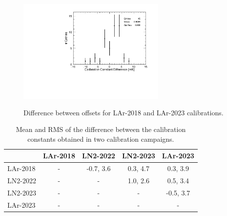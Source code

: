 \begin{figure}[htbp]
\centering
{\includegraphics[width=0.65\textwidth]{images/figure_20.pdf}}
\caption{Difference between offsets for LAr-2018 and LAr-2023 calibrations.}
\label{fig:LAr2018AllDiff}
\end{figure}

\begin{table}[htbp]
\begin{center}
\begin{tabular}{l c c c c}
         & LAr-2018 & LN2-2022 & LN2-2023 & LAr-2023  \\ \hline
LAr-2018 &    -     & -0.7, 3.6& 0.3, 4.7 & 0.3, 3.9 \\ 
LN2-2022 &    -     &    -     & 1.0, 2.6 &  0.5, 3.4 \\ 
LN2-2023 &    -     &    -     &    -     & -0.5, 3.7 \\ 
LAr-2023 &    -     &    -     &    -     &     -     \\ 
\end{tabular}
\end{center}
\caption{Mean and RMS of the difference between the calibration constants obtained in two calibration campaigns.}
\label{tab:calib_comparison}
\end{table}

